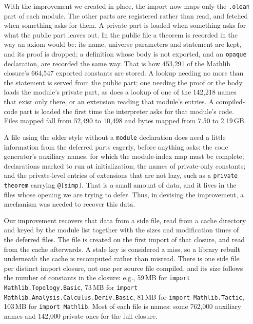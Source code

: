 \documentclass{article}
\newcommand{\mathlib}{Mathlib\xspace}
\begin{document}
With the improvement we created in place, the import now maps only the \texttt{.olean} part of each module. The other parts are registered rather than read, and fetched when something asks for them. A private part is loaded when something asks for what the public part leaves out. In the public file a theorem is recorded in the way an axiom would be: its name, universe parameters and statement are kept, and its proof is dropped; a definition whose body is not exported, and an \texttt{opaque} declaration, are recorded the same way. That is how 453{,}291 of the \mathlib closure's 664{,}547 exported constants are stored. A lookup needing no more than the statement is served from the public part; one needing the proof or the body loads the module's private part, as does a lookup of one of the 142{,}218 names that exist only there, or an extension reading that module's entries. A compiled-code part is loaded the first time the interpreter asks for that module's code. Files mapped fall from 52{,}490 to 10{,}498 and bytes mapped from 7.50 to 2.19\,GB.

A file using the older style without a \texttt{module} declaration does need a little information from the deferred parts eagerly, before anything asks: the code generator's auxiliary names, for which the module-index map must be complete; declarations marked to run at initialization; the names of private-only constants; and the private-level entries of extensions that are not lazy, such as a \texttt{private theorem} carrying \texttt{@[simp]}. That is a small amount of data, and it lives in the files whose opening we are trying to defer. Thus, in devising the improvement, a mechanism was needed to recover this data.

Our improvement recovers that data from a side file, read from a cache directory and keyed by the module list together with the sizes and modification times of the deferred files. The file is created on the first import of that closure, and read from the cache afterwards. A stale key is considered a miss, so a library rebuilt underneath the cache is recomputed rather than misread. There is one side file per distinct import closure, not one per source file compiled, and its size follows the number of constants in the closure: e.g., 59\,MB for \texttt{import Mathlib.Topology.Basic}, 73\,MB for \texttt{import Mathlib.Analysis.Calculus.Deriv.Basic}, 81\,MB for \texttt{import Mathlib.Tactic}, 103\,MB for \texttt{import Mathlib}. Most of each file is names: some 762{,}000 auxiliary names and 142{,}000 private ones for the full closure.
\end{document}
